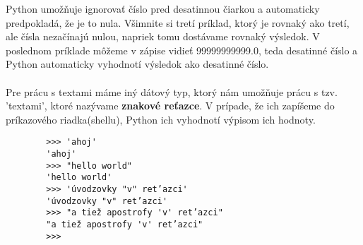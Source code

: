 \documentclass[a4paper,11pt]{report}
\begin{document}
	Python umožňuje ignorovať číslo pred desatinnou čiarkou a automaticky predpokladá, že je to nula. Všimnite si tretí príklad, ktorý je rovnaký ako tretí, ale čísla nezačínajú nulou, napriek tomu dostávame rovnaký výsledok. V poslednom príklade môžeme v zápise vidieť 99999999999.0, teda desatinné číslo a  Python automaticky vyhodnotí výsledok ako desatinné číslo. \\
	
	\noindent{} \\
	
	Pre prácu s textami máme iný dátový typ, ktorý nám umožňuje prácu s tzv. 'textami', ktoré nazývame \textbf{znakové reťazce}. V prípade, že ich zapíšeme do príkazového riadka(shellu), Python ich vyhodnotí výpisom ich hodnoty.
	
	\begin{verbatim}
		>>> 'ahoj'
		'ahoj'
		>>> "hello world"
		'hello world'
		>>> 'úvodzovky "v" ret’azci'
		'úvodzovky "v" ret’azci'
		>>> "a tiež apostrofy 'v' ret’azci"
		"a tiež apostrofy 'v' ret’azci"
		>>>
	\end{verbatim}
	
	\noindent{} \\
	
\end{document}
